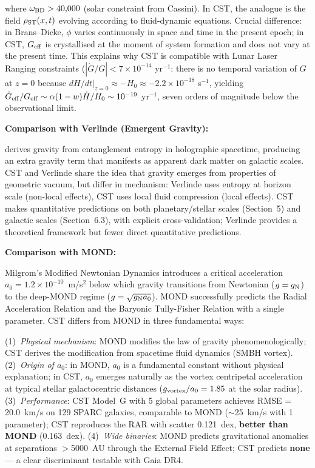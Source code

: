 \documentclass[10pt,a4paper]{article}
\begin{document}
where \(\omega_{\rm BD} > 40{,}000\) (solar constraint from Cassini). In
CST, the analogue is the field \(\rho_{\rm ST}(x,t)\) evolving according
to fluid-dynamic equations. Crucial difference: in Brans--Dicke,
\(\phi\) varies continuously in space and time in the present epoch; in
CST, \(G_{\rm eff}\) is crystallised at the moment of system formation
and does not vary at the present time. This explains why CST is
compatible with Lunar Laser Ranging constraints
(\(|\dot G/G| < 7\times10^{-14}\) yr\(^{-1}\): there is no temporal
variation of \(G\) at \(z = 0\) because
\(dH/dt|_{z=0} \approx -H_0 \approx -2.2\times10^{-18}\) s\(^{-1}\),
yielding
\(\dot G_{\rm eff}/G_{\rm eff} \sim \alpha (1-w) \dot H/H_0 \sim 10^{-19}\)
yr\(^{-1}\), seven orders of magnitude below the observational limit.

\textbf{Comparison with Verlinde (Emergent Gravity):}

\cite{Verlinde2017} derives gravity from entanglement entropy in holographic
spacetime, producing an extra gravity term that manifests as apparent
dark matter on galactic scales. CST and Verlinde share the idea that
gravity emerges from properties of geometric vacuum, but differ in
mechanism: Verlinde uses entropy at horizon scale (non-local effects),
CST uses local fluid compression (local effects). CST makes quantitative
predictions on both planetary/stellar scales (Section~5) and galactic scales (Section~6.3), with explicit cross-validation; Verlinde provides a theoretical framework but fewer direct quantitative predictions.

\textbf{Comparison with MOND:}

Milgrom's Modified Newtonian Dynamics \cite{Milgrom1983} introduces a critical acceleration $a_0 = 1.2 \times 10^{-10}$~m/s$^2$ below which gravity transitions from Newtonian ($g = g_{\rm N}$) to the deep-MOND regime ($g = \sqrt{g_{\rm N} a_0}$). MOND successfully predicts the Radial Acceleration Relation and the Baryonic Tully-Fisher Relation with a single parameter. CST differs from MOND in three fundamental ways:

(1)~\textit{Physical mechanism}: MOND modifies the law of gravity phenomenologically; CST derives the modification from spacetime fluid dynamics (SMBH vortex). (2)~\textit{Origin of $a_0$}: in MOND, $a_0$ is a fundamental constant without physical explanation; in CST, $a_0$ emerges naturally as the vortex centripetal acceleration at typical stellar galactocentric distances ($g_{\rm vortex}/a_0 = 1.85$ at the solar radius). (3)~\textit{Performance}: CST Model~G with 5 global parameters achieves RMSE = 20.0~km/s on 129 SPARC galaxies, comparable to MOND ($\sim$25~km/s with 1 parameter); CST reproduces the RAR with scatter 0.121~dex, \textbf{better than MOND} (0.163~dex). (4)~\textit{Wide binaries}: MOND predicts gravitational anomalies at separations $>$5000~AU through the External Field Effect; CST predicts \textbf{none} --- a clear discriminant testable with Gaia DR4.
\end{document}
